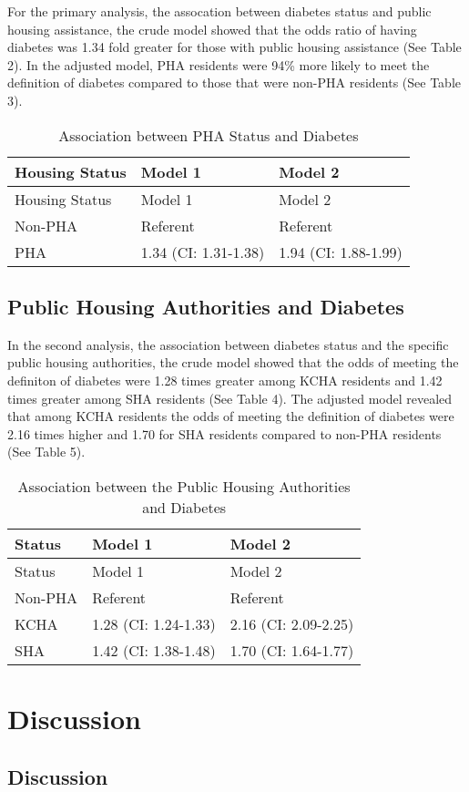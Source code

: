 \documentclass [11pt, proquest] {uwthesis}[2015/03/03]
\begin{document}
For the primary analysis, the assocation between diabetes status and
public housing assistance, the crude model showed that the odds ratio of
having diabetes was 1.34 fold greater for those with public housing
assistance (See Table 2). In the adjusted model, PHA residents were 94\%
more likely to meet the definition of diabetes compared to those that
were non-PHA residents (See Table 3).
\begin{longtable}[]{@{}lll@{}}
\caption{\label{tab:inher} Association between PHA Status and
Diabetes}\tabularnewline
\toprule
Housing Status & Model 1 & Model 2\tabularnewline
\midrule
\endfirsthead
\toprule
Housing Status & Model 1 & Model 2\tabularnewline
\midrule
\endhead
Non-PHA & Referent & Referent\tabularnewline
PHA & 1.34 (CI: 1.31-1.38) & 1.94 (CI: 1.88-1.99)\tabularnewline
\bottomrule
\end{longtable}
\section{Public Housing Authorities and
Diabetes}\label{public-housing-authorities-and-diabetes}

In the second analysis, the association between diabetes status and the
specific public housing authorities, the crude model showed that the
odds of meeting the definiton of diabetes were 1.28 times greater among
KCHA residents and 1.42 times greater among SHA residents (See Table 4).
The adjusted model revealed that among KCHA residents the odds of
meeting the definition of diabetes were 2.16 times higher and 1.70 for
SHA residents compared to non-PHA residents (See Table 5).
\begin{longtable}[]{@{}lll@{}}
\caption{\label{tab:inher} Association between the Public Housing
Authorities and Diabetes}\tabularnewline
\toprule
Status & Model 1 & Model 2\tabularnewline
\midrule
\endfirsthead
\toprule
Status & Model 1 & Model 2\tabularnewline
\midrule
\endhead
Non-PHA & Referent & Referent\tabularnewline
KCHA & 1.28 (CI: 1.24-1.33) & 2.16 (CI: 2.09-2.25)\tabularnewline
SHA & 1.42 (CI: 1.38-1.48) & 1.70 (CI: 1.64-1.77)\tabularnewline
\bottomrule
\end{longtable}
\chapter{Discussion}\label{discussion}

\section{Discussion}\label{discussion-1}
\end{document}
